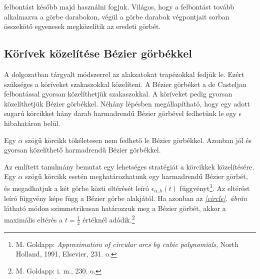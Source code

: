 \documentclass[12pt]{report}
\theoremstyle{definition}
\begin{document}
 felbontást később majd használni fogjuk. Világos, hogy a felbontást
tovább alkalmazva a görbe darabokon, végül a görbe darabok végpontjait sorban
összekötő egyenesek megközelítik az eredeti görbét.

    \subsection*{Körívek közelítése Bézier görbékkel}
    \label{arctobezier}

A dolgozatban tárgyalt módszerrel az alakzatokat trapézokkal fedjük le. Ezért
szükséges a köríveket szakaszokkal közelíteni. A Bézier görbéket a de Casteljau
felbontással gyorsan közelíthetjük szakaszokkal. A köríveket pedig gyorsan
közelíthetjük Bézier görbékkel. Néhány lépésben megállapítható, hogy egy adott
sugarú körcikket hány darab harmadrendű Bézier görbével fedhetünk le egy
$\epsilon$ hibahatáron belül.

Egy $\alpha$ szögű körcikk tökéletesen nem fedhető le Bézier
görbékkel\cite[Goldapp]{Goldapp:1991:approximation}. Azonban jól és gyorsan
közelíthető harmadrendű Bézier görbékkel.

Az említett \cite[Goldapp]{Goldapp:1991:approximation} tanulmány bemutat egy
lehetséges stratégiát a körcikkek közelítésére. Egy $\alpha$ szögű körcikk
esetén meghatározhatunk egy harmadrendű Bézier görbét, és megadhatjuk a két
görbe közti eltérését leíró $\epsilon_{\alpha,h}(t)$ függvényt\footnote{M.
Goldapp: \emph{Approximation of circular arcs by cubic polynomials}, North
Holland, 1991, Elsevier, 231. o.}. Az eltérést leíró függvény képe függ a Bézier
görbe alakjától. Ha azonban az \emph{\ref{circle}. ábrán} látható módon
szimmetrikusan határozzuk meg a Bézier görbét, akkor a maximális eltérés a
$t=\frac{1}{2}$ értéknél adódik.\footnote{M. Goldapp: i. m., 230. o.}
\end{document}
